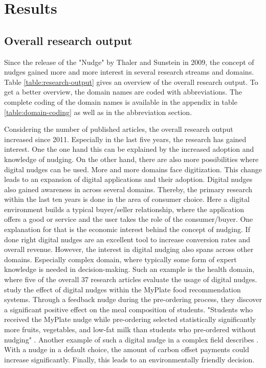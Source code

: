 \section{Results}

\subsection{Overall research output}
Since the release of the "Nudge" by Thaler and Sunstein in 2009, the concept of nudges gained more and more interest in several research streams and domains. Table \ref{table:research-output} gives an overview of the overall research output. To get a better overview, the domain names are coded with abbreviations. The complete coding of the domain names is available in the appendix in table \ref{table:domain-coding} as well as in the abbreviation section.

Considering the number of published articles, the overall research output increased since 2011. Especially in the last five years, the research has gained interest. One the one hand this can be explained by the increased adoption and knowledge of nudging. On the other hand, there are also more possibilities where digital nudges can be used. More and more domains face digitization. This change leads to an expansion of digital applications and their adoption. %
Digital nudges also gained awareness in across several domains. Thereby, the primary research within the last ten years is done in the area of consumer choice. Here a digital environment builds a typical buyer/seller relationship, where the application offers a good or service and the user takes the role of the consumer/buyer. One explanation for that is the economic interest behind the concept of nudging. If done right digital nudges are an excellent tool to increase conversion rates and overall revenue. %
However, the interest in digital nudging also spans across other domains. Especially complex domain, where typically some form of expert knowledge is needed in decision-making. Such an example is the health domain, where five of the overall 37 research articles evaluate the usage of digital nudges. \cite{miller_effects_2016} study the effect of digital nudges within the MyPlate food recommendation systems. Through a feedback nudge during the pre-ordering process, they discover a significant positive effect on the meal composition of students. "Students who received the MyPlate nudge while pre-ordering selected statistically significantly more fruits, vegetables, and low-fat milk than students who pre-ordered without nudging" \cite{miller_effects_2016}.
Another example of such a digital nudge in a complex field describes \cite{szekely_nudging_2016}. With a nudge in a default choice, the amount of carbon offset payments could increase significantly. Finally, this leads to an environmentally friendly decision.


